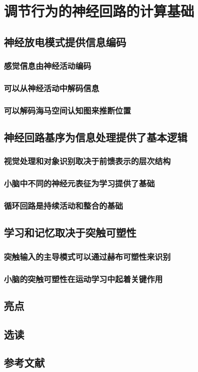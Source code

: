 \chapter{调节行为的神经回路的计算基础}

\section{神经放电模式提供信息编码}

\subsection{感觉信息由神经活动编码}
\subsection{可以从神经活动中解码信息}
\subsection{可以解码海马空间认知图来推断位置}


\section{神经回路基序为信息处理提供了基本逻辑}
\subsection{视觉处理和对象识别取决于前馈表示的层次结构}
\subsection{小脑中不同的神经元表征为学习提供了基础}
\subsection{循环回路是持续活动和整合的基础}

\section{学习和记忆取决于突触可塑性}
\subsection{突触输入的主导模式可以通过赫布可塑性来识别}
\subsection{小脑的突触可塑性在运动学习中起着关键作用}

\section{亮点}
\section{选读}
\section{参考文献}


